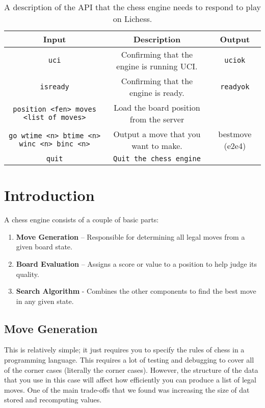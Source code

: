 \documentclass[sigconf]{acmart}
\begin{document}
\begin{table*}[h]
    \centering
    \renewcommand{\arraystretch}{1.2}
    \setlength{\tabcolsep}{8pt}
    \begin{tabular}{|c|c|c|}
        \hline
        \textbf{Input} & \textbf{Description} & \textbf{Output} \\
        \hline
        \texttt{uci} & Confirming that the engine is running UCI. & \texttt{uciok} \\
        \hline
        \texttt{isready} & Confirming that the engine is ready. & \texttt{readyok} \\
        \hline
        \texttt{position <fen> moves <list of moves>} & Load the board position from the server & \\
        \hline
        \texttt{go wtime <n> btime <n> winc <n> binc <n>} & Output a move that you want to make. & bestmove (e2e4) \\
        \hline
        \texttt{quit} & \texttt{Quit the chess engine} & \\
        \hline
    \end{tabular}
    \caption{A description of the API that the chess engine needs to respond to play on Lichess.}
    \label{tab:api}
\end{table*}


\section{Introduction}
A chess engine consists of a couple of basic parts:
\begin{enumerate}
    \item \textbf{Move Generation} – Responsible for determining all legal moves from a given board state.
    \item \textbf{Board Evaluation} – Assigns a score or value to a position to help judge its quality.
    \item \textbf{Search Algorithm} - Combines the other components to find the best move in any given state.
\end{enumerate}

\subsection{Move Generation}
This is relatively simple; it just requires you to specify the rules of chess in a programming language. 
This requires a lot of testing and debugging to cover all of the corner cases (literally the corner cases).
However, the structure of the data that you use in this case will affect how efficiently you can produce a list of legal moves. 
One of the main trade-offs that we found was increasing the size of dat stored and recomputing values.
\end{document}
